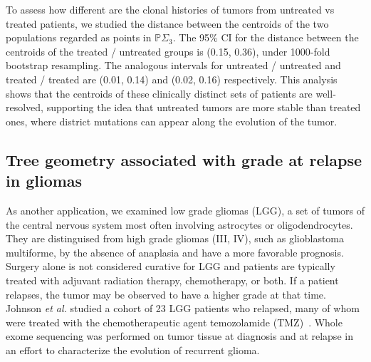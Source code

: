 \documentclass[a4paper,11pt]{article}
\begin{document}
To assess how different are the clonal histories of tumors from untreated vs treated patients, we studied the distance between the centroids of the two populations regarded as points in $\mathbb{P}\Sigma_3$.
The 95\% CI for the distance between the centroids of the treated / untreated groups is (0.15, 0.36), under 1000-fold bootstrap resampling.
The analogous intervals for untreated / untreated and treated / treated are (0.01, 0.14) and (0.02, 0.16) respectively.
This analysis shows that the centroids of these clinically distinct sets of patients are well-resolved, supporting the idea that untreated tumors are more stable than treated ones, where district mutations can appear along the evolution of the tumor.

\subsection{Tree geometry associated with grade at relapse in gliomas}\label{sec:glioma}

As another application, we examined low grade gliomas (LGG), a set of tumors of the central nervous system most often involving astrocytes or oligodendrocytes.
They are distinguised from high grade gliomas (III, IV), such as glioblastoma multiforme, by the absence of anaplasia and have a more favorable prognosis.
Surgery alone is not considered curative for LGG and patients are typically treated with adjuvant radiation therapy, chemotherapy, or both.
If a patient relapses, the tumor may be observed to have a higher grade at that time.
Johnson \textit{et al.} studied a cohort of 23 LGG patients who relapsed, many of whom were treated with the chemotherapeutic agent temozolamide (TMZ)~\cite{johnson2014mutational}.
Whole exome sequencing was performed on tumor tissue at diagnosis and at relapse in an effort to characterize the evolution of recurrent glioma.
\end{document}
